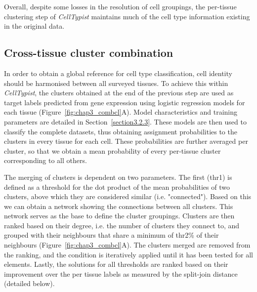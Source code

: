 Overall, despite some losses in the resolution of cell groupings, the per-tissue clustering step of \textit{CellTypist} maintains much of the cell type information existing in the original data.


\subsection{Cross-tissue cluster combination}
\label{section3.2.2}
In order to obtain a global reference for cell type classification, cell identity should be harmonised between all surveyed tissues. To achieve this within \textit{CellTypist}, the clusters obtained at the end of the previous step are used as target labels predicted from gene expression using logistic regression models for each tissue (Figure~\ref{fig:chap3_combcl}A). Model characteristics and training parameters are detailed in Section~\ref{section3.2.3}. These models are then used to classify the complete datasets, thus obtaining assignment probabilities to the clusters in every tissue for each cell. These probabilities are further averaged per cluster, so that we obtain a mean probability of every per-tissue cluster corresponding to all others.

The merging of clusters is dependent on two parameters. The first (thr1) is defined as a threshold for the dot product of the mean probabilities of two clusters, above which they are considered similar (i.e. "connected"). Based on this we can obtain a network showing the connections between all clusters. This network serves as the base to define the cluster groupings. Clusters are then ranked based on their degree, i.e. the number of clusters they connect to, and grouped with their neighbours that share a minimum of thr2\% of their neighbours (Figure~\ref{fig:chap3_combcl}A). The clusters merged are removed from the ranking, and the condition is iteratively applied until it has been tested for all elements. Lastly, the solutions for all thresholds are ranked based on their improvement over the per tissue labels as measured by the split-join distance (detailed below).

